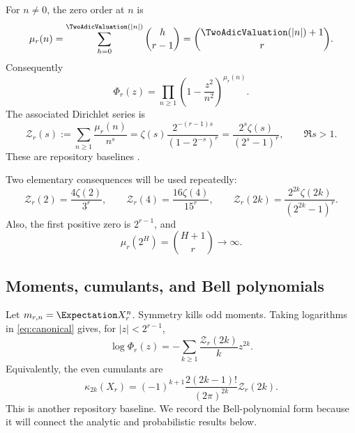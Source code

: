 \documentclass[11pt,oneside]{article}
\theoremstyle{definition}
\theoremstyle{remark}
\newcommand{\ZetaR}{\mathcal Z}
\begin{document}
For $n\neq0$, the zero order at $n$ is
\begin{equation}\label{eq:mu-r}
 \mu_r(n)=\sum_{h=0}^{\TwoAdicValuation(|n|)}\binom h{r-1}
 =\binom{\TwoAdicValuation(|n|)+1}{r}.
\end{equation}
Consequently
\begin{equation}\label{eq:canonical}
 \Phi_r(z)=\prod_{n\geq1}
 \left(1-\frac{z^2}{n^2}\right)^{\mu_r(n)}.
\end{equation}
The associated Dirichlet series is
\begin{equation}\label{eq:spectral-zeta}
 \ZetaR_r(s):=\sum_{n\geq1}\frac{\mu_r(n)}{n^s}
 =\zeta(s)\frac{2^{-(r-1)s}}{(1-2^{-s})^r}
 =\frac{2^s\zeta(s)}{(2^s-1)^r},\qquad \Re s>1.
\end{equation}
These are repository baselines \cite{repo-spectra}.

Two elementary consequences will be used repeatedly:
\begin{equation}\label{eq:zeta-special}
 \ZetaR_r(2)=\frac{4\zeta(2)}{3^r},\qquad
 \ZetaR_r(4)=\frac{16\zeta(4)}{15^r},\qquad
 \ZetaR_r(2k)=\frac{2^{2k}\zeta(2k)}{(2^{2k}-1)^r}.
\end{equation}
Also, the first positive zero is $2^{r-1}$, and
\begin{equation}\label{eq:unbounded-multiplicity}
 \mu_r(2^H)=\binom{H+1}{r}\longrightarrow\infty.
\end{equation}

\subsection{Moments, cumulants, and Bell polynomials}

Let $m_{r,n}=\Expectation X_r^n$.  Symmetry kills odd moments.  Taking logarithms in
\eqref{eq:canonical} gives, for $|z|<2^{r-1}$,
\begin{equation}\label{eq:log-Phi}
 \log\Phi_r(z)=-\sum_{k\geq1}\frac{\ZetaR_r(2k)}{k}z^{2k}.
\end{equation}
Equivalently, the even cumulants are
\begin{equation}\label{eq:cumulants-X}
 \kappa_{2k}(X_r)=(-1)^{k+1}
 \frac{2(2k-1)!}{(2\pi)^{2k}}\ZetaR_r(2k).
\end{equation}
This is another repository baseline.  We record the Bell-polynomial form
because it will connect the analytic and probabilistic results below.
\end{document}
